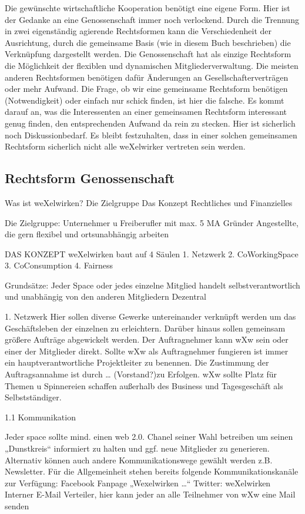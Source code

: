Die gewünschte wirtschaftliche Kooperation benötigt eine eigene Form.
%
Hier ist der Gedanke an eine Genossenschaft immer noch verlockend.
%
Durch die Trennung in zwei eigenständig agierende Rechtsformen kann die Verschiedenheit der Ausrichtung, durch die gemeinsame Basis (wie in diesem Buch beschrieben) die Verknüpfung dargestellt werden.
%
Die Genossenschaft hat als einzige Rechtsform die Möglichkeit der flexiblen und dynamischen Mitgliederverwaltung.
%
Die meisten anderen Rechtsformen benötigen dafür Änderungen an Gesellschafterverträgen oder mehr Aufwand.
%
Die Frage, ob wir eine gemeinsame Rechtsform benötigen (Notwendigkeit) oder einfach nur schick finden, ist hier die falsche.
%
Es kommt darauf an, was die Interessenten an einer gemeinsamen Rechtsform interessant genug finden, den entsprechenden Aufwand da rein zu stecken.
%
Hier ist sicherlich noch Diskussionbedarf.
%
Es bleibt festzuhalten, dass in einer solchen gemeinsamen Rechtsform sicherlich nicht alle weXelwirker vertreten sein werden.
    \subsection{Rechtsform Genossenschaft}
Was ist weXelwirken?
Die Zielgruppe
Das Konzept
Rechtliches und Finanzielles

Die Zielgruppe:
Unternehmer u Freiberufler mit max. 5 MA
Gründer
Angestellte, die gern flexibel und ortsunabhängig arbeiten 


DAS KONZEPT
weXelwirken baut auf 4 Säulen
1. Netzwerk
2. CoWorkingSpace
3. CoConsumption 
4. Fairness 

Grundsätze:
Jeder Space oder jedes einzelne Mitglied handelt selbstverantwortlich und unabhängig von den anderen Mitgliedern
Dezentral



1. Netzwerk
Hier sollen diverse Gewerke untereinander verknüpft werden um das Geschäftsleben der einzelnen zu erleichtern. Darüber hinaus sollen gemeinsam größere Aufträge abgewickelt werden. Der Auftragnehmer kann wXw sein oder einer der Mitglieder direkt.
Sollte wXw als Auftragnehmer fungieren ist immer ein hauptverantwortliche Projektleiter zu benennen. Die Zustimmung der Auftragsannahme ist durch … (Vorstand?)zu Erfolgen.
wXw sollte Platz für Themen u Spinnereien schaffen außerhalb des Business und Tagesgeschäft als Selbstständiger.

1.1 Kommunikation 

Jeder space sollte mind. einen web 2.0. Chanel seiner Wahl betreiben um seinen „Dunstkreis“ informiert zu halten und ggf. neue Mitglieder zu generieren. Alternativ können auch andere Kommunikationswege gewählt werden z.B. Newsletter.
Für die Allgemeinheit stehen bereits folgende Kommunikationskanäle zur Verfügung:
Facebook Fanpage „Wexelwirken …“
Twitter: weXelwirken
Interner E-Mail Verteiler, hier kann jeder an alle Teilnehmer von wXw eine Mail senden 



